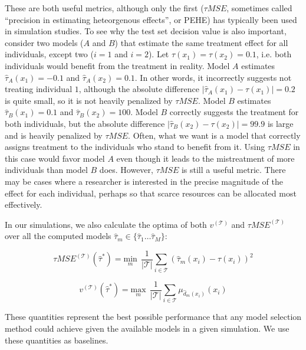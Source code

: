 These are both useful metrics, although only the first ($\tau MSE$, sometimes called ``precision in estimating heteorgenous effects'', or PEHE) has typically been used in simulation studies. To see why the test set decision value is also important, consider two models ($A$ and $B$) that estimate the same treatment effect for all individuals, except two ($i=1$ and $i=2$). Let $\tau(x_1) = \tau(x_2) = 0.1$, i.e. both individuals would benefit from the treatment in reality. Model $A$ estimates $\hat\tau_A(x_1) = -0.1$ and $\hat\tau_A(x_2) = 0.1$. In other words, it incorrectly suggests not treating individual $1$, although the absolute difference $|\hat\tau_A(x_1)-\tau(x_1)| = 0.2$ is quite small, so it is not heavily penalized by $\tau MSE$. Model $B$ estimates $\hat\tau_B(x_1) = 0.1$ and $\hat\tau_B(x_2) = 100$. Model $B$ correctly suggests the treatment for both individuals, but the absolute difference $|\hat\tau_B(x_2)-\tau(x_2)| = 99.9$ is large and is heavily penalized by $\tau MSE$. Often, what we want is a model that correctly assigns treatment to the individuals who stand to benefit from it. Using $\tau MSE$ in this case would favor model $A$ even though it leads to the mistreatment of more individuals than model $B$ does. However, $\tau MSE$ is still a useful metric. There may be cases where a researcher is interested in the precise magnitude of the effect for each individual, perhaps so that scarce resources can be allocated most effectively. 

In our simulations, we also calculate the optima of both $v^{(\mathcal{T})}$ and $\tau MSE^{(\mathcal{T})}$ over all the computed models $\hat\tau_m \in \{\hat\tau_1 \dots \hat\tau_M\}$:

\[
\tau MSE^{(\mathcal{T})}(\hat\tau^{*}) = \underset{m}{\text{min}} \ \ \frac{1}{|\mathcal{T}|}\sum_{i \in \mathcal{T}} (\hat\tau_m (x_i) - \tau(x_i))^2
\]

\[
v^{(\mathcal{T})}(\hat\tau^{*}) = \underset{m}{\text{max}} \ \ \frac{1}{|\mathcal{T}|}\sum_{i \in \mathcal{T}} \mu_{\hat d_m(x_i)}(x_i)
\]

These quantities represent the best possible performance that any model selection method could achieve given the available models in a given simulation. We use these quantities as baselines.


